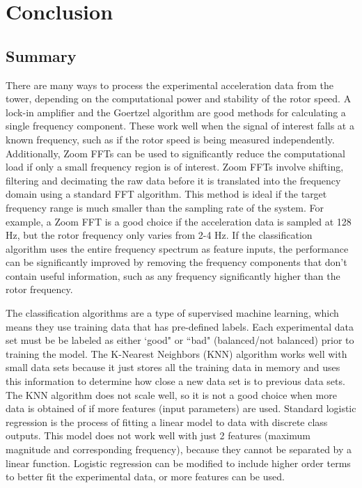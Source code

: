 \chapter{Conclusion} %

\label{ch_conclusion} %

\section{Summary}
There are many ways to process the experimental acceleration data from the tower, depending on the computational power and stability of the rotor speed.  A lock-in amplifier and the Goertzel algorithm are good methods for calculating a single frequency component.  These work well when the signal of interest falls at a known frequency, such as if the rotor speed is being measured independently.  Additionally, Zoom FFTs can be used to significantly reduce the computational load if only a small frequency region is of interest.  Zoom FFTs involve shifting, filtering and decimating the raw data before it is translated into the frequency domain using a standard FFT algorithm.  This method is ideal if the target frequency range is much smaller than the sampling rate of the system.  For example, a Zoom FFT is a good choice if the acceleration data is sampled at 128 Hz, but the rotor frequency only varies from 2-4 Hz.  If the classification algorithm uses the entire frequency spectrum as feature inputs, the performance can be significantly improved by removing the frequency components that don't contain useful information, such as any frequency significantly higher than the rotor frequency.

The classification algorithms are a type of supervised machine learning, which means they use training data that has pre-defined labels.  Each experimental data set must be be labeled as either `good" or ``bad" (balanced/not balanced) prior to training the model.  The K-Nearest Neighbors (KNN) algorithm works well with small data sets because it just stores all the training data in memory and uses this information to determine how close a new data set is to previous data sets.  The KNN algorithm does not scale well, so it is not a good choice when more data is obtained of if more features (input parameters) are used.  Standard logistic regression is the process of fitting a linear model to data with discrete class outputs.  This model does not work well with just 2 features (maximum magnitude and corresponding frequency), because they cannot be separated by a linear function.  Logistic regression can be modified to include higher order terms to better fit the experimental data, or more features can be used.

